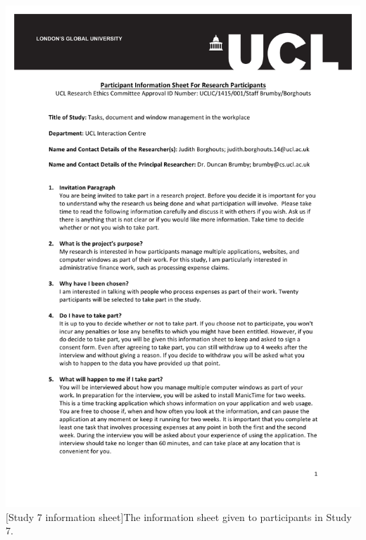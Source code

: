 

%
{%
  \centering
  \includegraphics[page=3,scale=.75]{images/appendix/Study7-Informationsheet.pdf}
  [Study 7 information sheet]{The information sheet given to participants in Study 7.}
  \par
}

